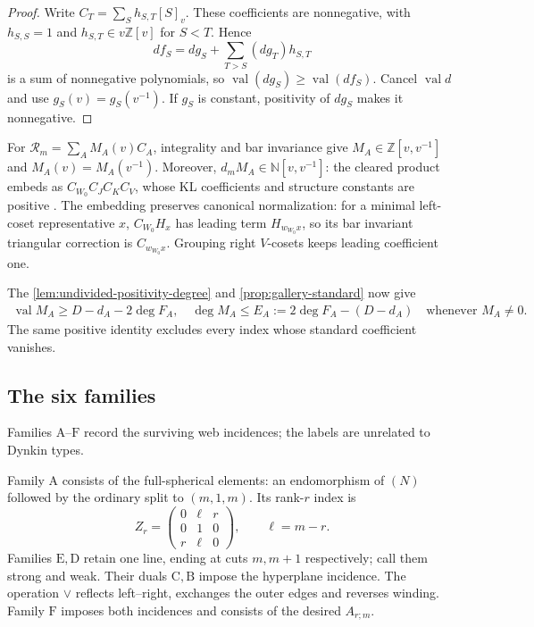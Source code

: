 \documentclass[a4paper,11pt]{amsart}
\numberwithin{equation}{subsection}
\theoremstyle{plain}
\theoremstyle{definition}
\theoremstyle{remark}
\begin{document}
\begin{proof}
Write $C_T=\sum_S h_{S,T}[S]_v$. These coefficients are
nonnegative, with $h_{S,S}=1$ and $h_{S,T}\in v\mathbb Z[v]$
for $S<T$. Hence
\[
df_S=dg_S+\sum_{T>S}(dg_T)h_{S,T}
\]
is a sum of nonnegative polynomials, so
$\operatorname{val}(dg_S)\ge\operatorname{val}(df_S)$.
Cancel $\operatorname{val}d$ and use $g_S(v)=g_S(v^{-1})$.
If $g_S$ is constant, positivity of $dg_S$ makes it nonnegative.
\end{proof}

For $\mathcal R_m=\sum_A M_A(v)C_A$, integrality and bar invariance
give $M_A\in\mathbb Z[v,v^{-1}]$ and $M_A(v)=M_A(v^{-1})$.
Moreover, $d_mM_A\in\mathbb N[v,v^{-1}]$: the cleared product
embeds as $C_{W_0}C_JC_KC_V$,
whose KL coefficients and structure constants are positive
\cite{KL80,Springer82}.
The embedding preserves canonical normalization: for a minimal
left-coset representative $x$, $C_{W_0}H_x$ has leading term
$H_{w_{W_0}x}$, so its bar invariant triangular correction is
$C_{w_{W_0}x}$. Grouping right $V$-cosets keeps leading coefficient one.

The \autoref{lem:undivided-positivity-degree} and \autoref{prop:gallery-standard} now give
\begin{gather}\label{eq:relevance-bound}
\operatorname{val}M_A\ge D-d_A-2\deg F_A,\quad
\deg M_A\le E_A:=2\deg F_A-(D-d_A)
\quad\text{whenever }M_A\ne0.
\end{gather}
The same positive identity excludes every
index whose standard coefficient vanishes.

\subsection{The six families}

Families $\mathrm A$--$\mathrm F$ record the surviving web incidences;
the labels are unrelated to Dynkin types.

\begin{definition}\label{def:six-families}
Family $\mathrm A$ consists of the full-spherical elements:
an endomorphism of $(N)$ followed by the ordinary split to $(m,1,m)$.
Its rank-$r$ index is
\[
Z_r=\begin{pmatrix}0&\ell&r\\0&1&0\\r&\ell&0\end{pmatrix},
\qquad\ell=m-r.
\]
Families $\mathrm E,\mathrm D$ retain one line, ending at cuts
$m,m+1$ respectively; call them strong and weak.
Their duals $\mathrm C,\mathrm B$ impose the hyperplane incidence.
The operation $\vee$ reflects left--right, exchanges the outer
edges and reverses winding. Family $\mathrm F$ imposes both
incidences and consists of the desired $A_{r;m}$.
\end{definition}
\end{document}
